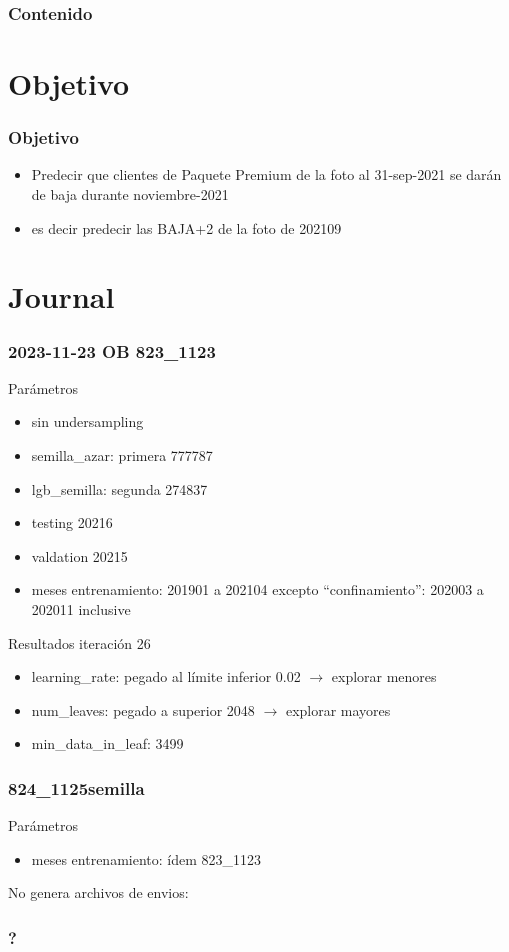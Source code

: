 \documentclass[aspectratio=43]{beamer}
\begin{document}
\begin{frame}
	\frametitle{Contenido}
	\tableofcontents
\end{frame}

\section{Objetivo}

\begin{frame}
	\frametitle{Objetivo}
	\begin{itemize}
		\item Predecir que clientes de Paquete Premium de la foto al 31-sep-2021 se darán de baja durante noviembre-2021
		\item es decir predecir las BAJA+2 de la foto de 202109
	\end{itemize}
\end{frame}

\section{Journal}

\begin{frame}
	\frametitle{2023-11-23 OB 823\_1123}
	Parámetros
	\begin{itemize}
		\item sin undersampling
		\item semilla\_azar: primera 777787
		\item lgb\_semilla: segunda 274837
		\item testing 20216
		\item valdation 20215
		\item meses entrenamiento: 201901 a 202104 excepto ``confinamiento'': 202003 a 202011 inclusive
	\end{itemize}
	Resultados iteración 26
	\begin{itemize}
		\item learning\_rate: pegado al límite inferior 0.02  \(\rightarrow\) explorar menores
		\item num\_leaves: pegado a superior 2048 \(\rightarrow\) explorar mayores
		\item min\_data\_in\_leaf: 3499 
	\end{itemize}
\end{frame}


\begin{frame}
	\frametitle{824\_1125semilla}
	Parámetros
	\begin{itemize}
		\item meses entrenamiento: ídem 823\_1123
	\end{itemize}
	No genera archivos de envios:
\end{frame}


\begin{frame}
	\frametitle{?}
\end{frame}
\end{document}
